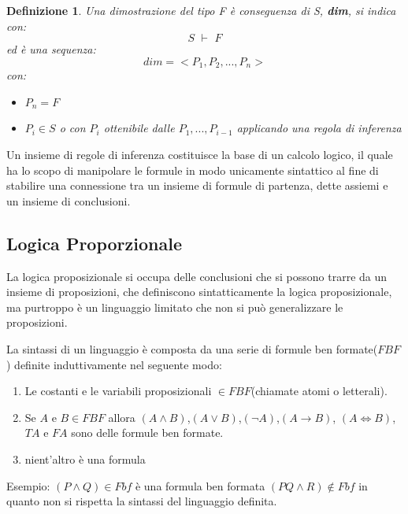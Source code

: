 \documentclass[a4paper]{report}
\newtheorem{defi}{Definizione}%
\begin{document}
\begin{defi}
Una dimostrazione del tipo \textit{F è conseguenza di S}, \textbf{dim}, si indica con:
\begin{equation*}
  S\,\,\vdash\,\, F
\end{equation*}
ed è una sequenza:
\begin{equation*}
  dim=<P_1,P_2,...,P_n>
\end{equation*}
con:
\begin{itemize}
\item $P_n=F$
\item $P_i \in S$ o con $P_i$ ottenibile dalle $P_1,...,P_{i-1}$ applicando una regola di inferenza
\end{itemize}
\end{defi}
Un insieme di regole di inferenza costituisce la base di un calcolo logico, il quale ha lo scopo di manipolare le formule in modo
unicamente sintattico al fine di stabilire una connessione tra un insieme di formule di partenza, dette assiemi e un insieme di conclusioni.

\subsection{Logica Proporzionale}
La logica proposizionale si occupa delle conclusioni che si possono trarre da un insieme di proposizioni, che definiscono sintatticamente la logica
proposizionale, ma purtroppo è un linguaggio limitato che non si può generalizzare le proposizioni.

La sintassi di un linguaggio è composta da una serie di formule ben formate($FBF$) definite induttivamente nel seguente modo:
\begin{enumerate}
  \item Le costanti e le variabili proposizionali $\in FBF$(chiamate atomi o letterali).
  \item Se $A$ e $B \in FBF$ allora $(A \land B)$,$(A \lor B)$,$(\neg A)$,$(A \rightarrow B)$,
        $(A \iff B)$,$TA$ e $FA$ sono delle formule ben formate.
  \item nient'altro è una formula
\end{enumerate}

Esempio:\newline
$(P \land Q) \in Fbf$  è una formula ben formata\newline
$(PQ \land R) \not \in Fbf$ in quanto non si rispetta la sintassi del linguaggio definita.\newline
\end{document}
